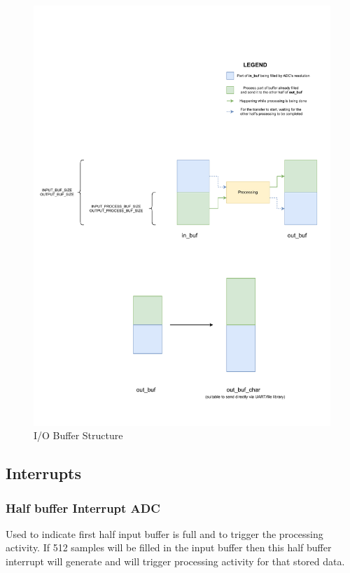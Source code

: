 \documentclass[11pt]{article}
\begin{document}
\begin{figure}[H]
    \centering
    \includegraphics[width=1\textwidth, trim={0cm 1cm 0cm 4cm}, clip]{IO_Buffer_Structure.pdf}
    \caption{I/O Buffer Structure}
    \end{figure}

\subsection{Interrupts}
\label{sec:orgb11cdca}
\subsubsection*{Half buffer Interrupt ADC}
\label{sec:orga247c32}
Used to indicate first half input buffer is full and to trigger the processing activity. If 512 samples will be filled in the input buffer then this half buffer interrupt will generate and will trigger processing activity for that stored data.
\end{document}
